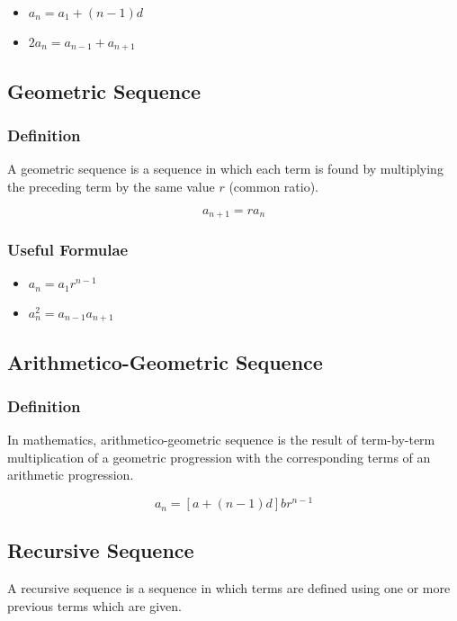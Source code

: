 \documentclass{article}
\begin{document}
\begin{itemize}
    \item $a_{n}=a_1+(n-1)d$
    \item $2a_{n}=a_{n-1}+a_{n+1}$
\end{itemize}

\subsection{Geometric Sequence}

\subsubsection{Definition}

A geometric sequence is a sequence in which each term is found by multiplying the preceding term by the same value $r$ (common ratio).

$$a_{n+1}=ra_{n}$$

\subsubsection{Useful Formulae}

\begin{itemize}
    \item $a_{n}=a_1r^{n-1}$
    \item $a_{n}^2=a_{n-1}a_{n+1}$
\end{itemize}

\subsection{Arithmetico-Geometric Sequence}

\subsubsection{Definition}

In mathematics, arithmetico-geometric sequence is the result of term-by-term multiplication of a geometric progression with the corresponding terms of an arithmetic progression. 

$$a_n=[a+(n-1)d]br^{n-1}$$

\subsection{Recursive Sequence}
A recursive sequence is a sequence in which terms are defined using one or more previous terms which are given.
\end{document}
